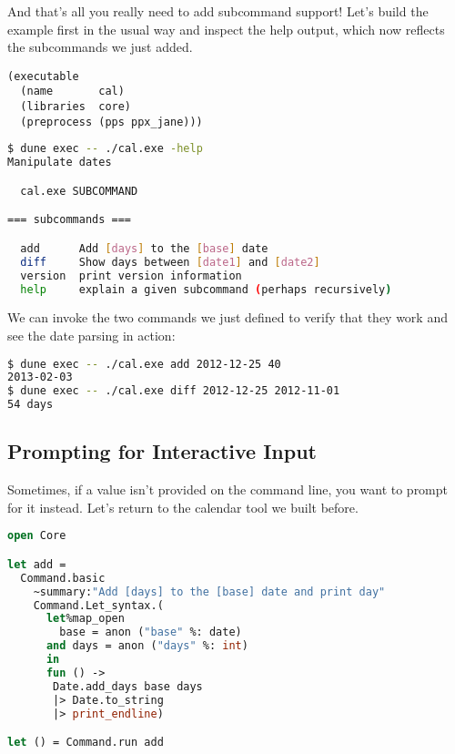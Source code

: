And that's all you really need to add subcommand support! Let's build
the example first in the usual way and inspect the help output, which
now reflects the subcommands we just added.

\begin{lstlisting}
(executable
  (name       cal)
  (libraries  core)
  (preprocess (pps ppx_jane)))
\end{lstlisting}

\begin{lstlisting}[language=bash]
$ dune exec -- ./cal.exe -help
Manipulate dates

  cal.exe SUBCOMMAND

=== subcommands ===

  add      Add [days] to the [base] date
  diff     Show days between [date1] and [date2]
  version  print version information
  help     explain a given subcommand (perhaps recursively)
\end{lstlisting}

We can invoke the two commands we just defined to verify that they work
and see the date parsing in action:

\begin{lstlisting}[language=bash]
$ dune exec -- ./cal.exe add 2012-12-25 40
2013-02-03
$ dune exec -- ./cal.exe diff 2012-12-25 2012-11-01
54 days
\end{lstlisting}

\hypertarget{prompting-for-interactive-input}{%
\subsection{Prompting for Interactive
Input}\label{prompting-for-interactive-input}}

Sometimes, if a value isn't provided on the command line, you want to
prompt for it instead. Let's return to the calendar tool we built
before. 

\begin{lstlisting}[language=Caml]
open Core

let add =
  Command.basic
    ~summary:"Add [days] to the [base] date and print day"
    Command.Let_syntax.(
      let%map_open
        base = anon ("base" %: date)
      and days = anon ("days" %: int)
      in
      fun () ->
       Date.add_days base days
       |> Date.to_string
       |> print_endline)

let () = Command.run add
\end{lstlisting}


